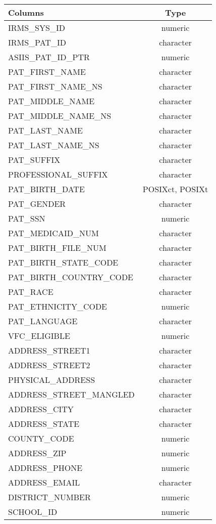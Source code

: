\documentclass[
  letterpaper,
  DIV=11,
  numbers=noendperiod]{scrreprt}
\begin{document}
\begin{longtable}{lc}
\toprule
Columns & Type \\ 
\midrule
IRMS\_SYS\_ID & numeric \\ 
IRMS\_PAT\_ID & character \\ 
ASIIS\_PAT\_ID\_PTR & numeric \\ 
PAT\_FIRST\_NAME & character \\ 
PAT\_FIRST\_NAME\_NS & character \\ 
PAT\_MIDDLE\_NAME & character \\ 
PAT\_MIDDLE\_NAME\_NS & character \\ 
PAT\_LAST\_NAME & character \\ 
PAT\_LAST\_NAME\_NS & character \\ 
PAT\_SUFFIX & character \\ 
PROFESSIONAL\_SUFFIX & character \\ 
PAT\_BIRTH\_DATE & POSIXct, POSIXt \\ 
PAT\_GENDER & character \\ 
PAT\_SSN & numeric \\ 
PAT\_MEDICAID\_NUM & character \\ 
PAT\_BIRTH\_FILE\_NUM & character \\ 
PAT\_BIRTH\_STATE\_CODE & character \\ 
PAT\_BIRTH\_COUNTRY\_CODE & character \\ 
PAT\_RACE & character \\ 
PAT\_ETHNICITY\_CODE & numeric \\ 
PAT\_LANGUAGE & character \\ 
VFC\_ELIGIBLE & numeric \\ 
ADDRESS\_STREET1 & character \\ 
ADDRESS\_STREET2 & character \\ 
PHYSICAL\_ADDRESS & character \\ 
ADDRESS\_STREET\_MANGLED & character \\ 
ADDRESS\_CITY & character \\ 
ADDRESS\_STATE & character \\ 
COUNTY\_CODE & numeric \\ 
ADDRESS\_ZIP & numeric \\ 
ADDRESS\_PHONE & numeric \\ 
ADDRESS\_EMAIL & character \\ 
DISTRICT\_NUMBER & numeric \\ 
SCHOOL\_ID & numeric \\ 

\end{longtable}
\end{document}
